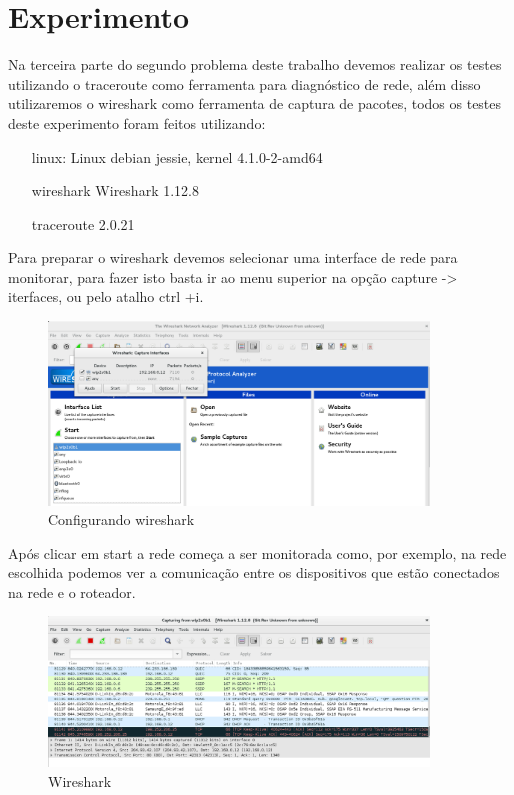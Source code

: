 \section{Experimento}

Na terceira parte do segundo problema deste trabalho devemos realizar os testes
utilizando o traceroute como ferramenta para diagnóstico de rede,
além disso utilizaremos o wireshark como ferramenta de captura de pacotes,
todos os testes deste experimento foram feitos utilizando:

\begin{itemize}
  \item[linux:] Linux debian jessie, kernel 4.1.0-2-amd64
  \item[wireshark] Wireshark 1.12.8
  \item[traceroute] 2.0.21
\end{itemize}

Para preparar o wireshark devemos selecionar uma interface de rede para monitorar,
para fazer isto basta ir ao menu superior na opção capture -> iterfaces, ou
pelo atalho ctrl +i.

\begin{figure}[h]
  \centering
  \includegraphics[width=0.9\textwidth]{figuras/f1.eps}
  \caption{Configurando wireshark}
  \label{fig:f1}
\end{figure}


Após clicar em start a rede começa a ser monitorada como, por exemplo,
na rede escolhida podemos ver a comunicação entre os dispositivos que estão
conectados na rede e o roteador.

\begin{figure}[h]
  \centering
  \includegraphics[width=0.9\textwidth]{figuras/f2.eps}
  \caption{Wireshark}
  \label{fig:f2}
\end{figure}


